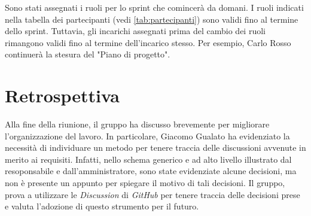 Sono stati assegnati i ruoli per lo sprint che comincerà da domani. I ruoli
indicati nella tabella dei partecipanti (vedi \autoref{tab:partecipanti}) sono
validi fino al termine dello sprint. Tuttavia, gli incarichi assegnati prima del
cambio dei ruoli rimangono validi fino al termine dell'incarico stesso. Per
esempio, Carlo Rosso continuerà la stesura del "Piano di progetto".

\section{Retrospettiva}

Alla fine della riunione, il gruppo ha discusso brevemente per migliorare
l'organizzazione del lavoro. In particolare, Giacomo Gualato ha evidenziato la
necessità di individuare un metodo per tenere traccia delle discussioni avvenute
in merito ai requisiti. Infatti, nello schema generico e ad alto livello
illustrato dal resoponsabile e dall'amministratore, sono state evidenziate alcune
decisioni, ma non è presente un appunto per spiegare il motivo di tali
decisioni. Il gruppo, prova a utilizzare le \textit{Discussion} di
\textit{GitHub} per tenere traccia delle decisioni prese e valuta l'adozione di
questo strumento per il futuro.
